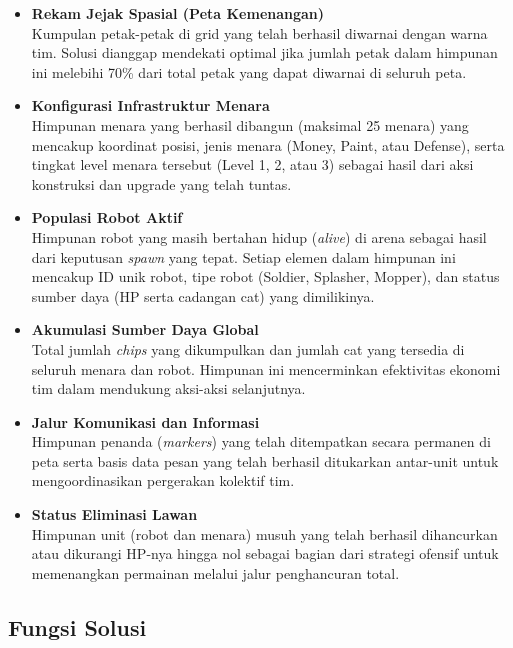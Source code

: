 \begin{itemize}
    \item \textbf{Rekam Jejak Spasial (Peta Kemenangan)}\\
          Kumpulan petak-petak di grid yang telah berhasil diwarnai dengan warna tim. Solusi dianggap mendekati optimal jika jumlah petak dalam himpunan ini melebihi 70\% dari total petak yang dapat diwarnai di seluruh peta.

    \item \textbf{Konfigurasi Infrastruktur Menara}\\
          Himpunan menara yang berhasil dibangun (maksimal 25 menara) yang mencakup koordinat posisi, jenis menara (Money, Paint, atau Defense), serta tingkat level menara tersebut (Level 1, 2, atau 3) sebagai hasil dari aksi konstruksi dan upgrade yang telah tuntas.

    \item \textbf{Populasi Robot Aktif}\\
          Himpunan robot yang masih bertahan hidup (\textit{alive}) di arena sebagai hasil dari keputusan \textit{spawn} yang tepat. Setiap elemen dalam himpunan ini mencakup ID unik robot, tipe robot (Soldier, Splasher, Mopper), dan status sumber daya (HP serta cadangan cat) yang dimilikinya.

    \item \textbf{Akumulasi Sumber Daya Global}\\
          Total jumlah \textit{chips} yang dikumpulkan dan jumlah cat yang tersedia di seluruh menara dan robot. Himpunan ini mencerminkan efektivitas ekonomi tim dalam mendukung aksi-aksi selanjutnya.

    \item \textbf{Jalur Komunikasi dan Informasi}\\
          Himpunan penanda (\textit{markers}) yang telah ditempatkan secara permanen di peta serta basis data pesan yang telah berhasil ditukarkan antar-unit untuk mengoordinasikan pergerakan kolektif tim.

    \item \textbf{Status Eliminasi Lawan}\\
          Himpunan unit (robot dan menara) musuh yang telah berhasil dihancurkan atau dikurangi HP-nya hingga nol sebagai bagian dari strategi ofensif untuk memenangkan permainan melalui jalur penghancuran total.
\end{itemize}

\subsection{Fungsi Solusi}

